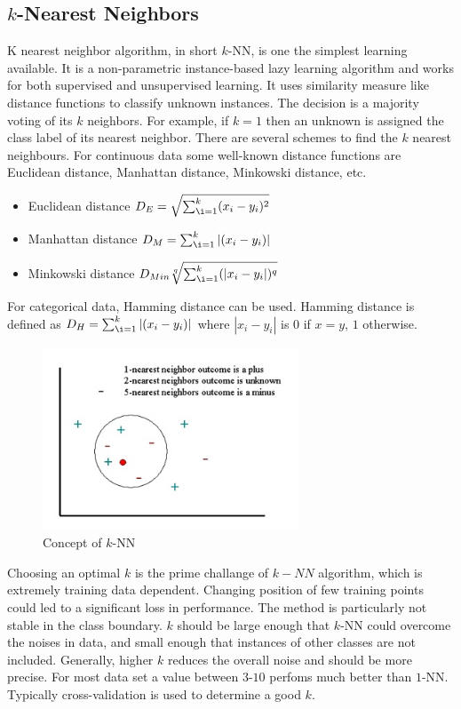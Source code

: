 \documentclass[a4paper, 11pt, oneside]{book}
\begin{document}
\subsection{$k$-Nearest Neighbors}
K nearest neighbor algorithm, in short $k$-NN, is one the simplest learning available. It is a non-parametric instance-based lazy learning algorithm and works for both supervised and unsupervised learning. It uses similarity measure like distance functions to classify unknown instances. The decision is a majority voting of its $k$ neighbors. For example, if $k= 1$ then an unknown is assigned the class label of its nearest neighbor. There are several schemes to find the $k$ nearest neighbours. For continuous data some well-known distance functions are Euclidean distance, Manhattan distance, Minkowski distance, etc.
\begin{itemize}
    \item Euclidean distance $D_E = \sqrt{\sum_{\i =1 }^{k} (x_i - y_i)^2}$
    \item Manhattan distance $D_M = \sum_{\i =1 }^{k} |(x_i - y_i)|$
    \item Minkowski distance $D_{Min}\sqrt[q]{\sum_{\i =1 }^{k} (|x_i - y_i|)^q}$
\end{itemize}
For categorical data, Hamming distance can be used. Hamming distance is defined as $D_H = \sum_{\i =1 }^{k} |(x_i - y_i)|$ where $|x_i - y_i|$ is $0$ if $x=y$, $1$ otherwise.

\begin{figure}[htbp]
    \begin{center}
        \includegraphics[width=3.0in]{figs/knn.jpg}
        \caption{Concept of $k$-NN}
        \label{fig:bg:knn}
    \end{center}
\end{figure}

Choosing an optimal $k$ is the prime challange of $k-NN$ algorithm, which is extremely training data dependent. Changing position of few training points could led to a significant loss in performance. The method is particularly not stable in the class boundary. $k$ should be large enough that $k$-NN could overcome the noises in data, and small enough that instances of other classes are not included. Generally, higher $k$ reduces the overall noise and should be more precise. For most data set a value between $3$-$10$ perfoms much better than $1$-NN. Typically cross-validation is used to determine a good $k$. 
\end{document}

